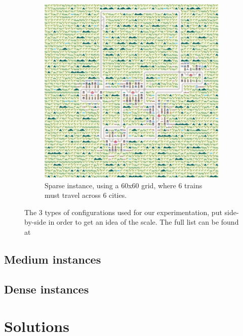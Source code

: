 \documentclass{llncs}
\begin{document}
\begin{figure}
\begin{minipage}{.41\textwidth}
	\end{minipage}
	\hfill
	\begin{minipage}{.49\textwidth}
				\begin{subfigure}{\textwidth}
		\centering
		\includegraphics[width=\textwidth]{sparse/sparse_0_1}
		\caption{Sparse instance, using a 60x60 grid, where 6 trains must travel across 6 cities.}
		\label{sparse_0_1}
				\end{subfigure}
	\end{minipage}
	\caption{The 3 types of configurations used for our experimentation, put side-by-side in order to get an idea of the scale. The full list can be found at \cite{instance_folder}}
	\label{sparse_medium_dense}
\end{figure}

\subsection{Medium instances}

\subsection{Dense instances}


\section{Solutions}
\end{document}
